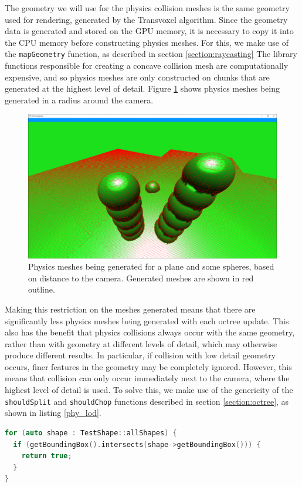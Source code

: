 \documentclass{article}
\begin{document}
The geometry we will use for the physics collision meshes is the same geometry used for rendering, generated by the Transvoxel algorithm. Since the geometry data is generated and stored on the GPU memory, it is necessary to copy it into the CPU memory before constructing physics meshes. For this, we make use of the \texttt{mapGeometry} function, as described in section \ref{section:raycasting}
The library functions responsible for creating a concave collision mesh are computationally expensive, and so physics meshes are only constructed on chunks that are generated at the highest level of detail. Figure \ref{fig:meshes1} shows physics meshes being generated in a radius around the camera.

\begin{figure}[H]
  \includegraphics[width=\textwidth]{meshes1.png}
  \caption{Physics meshes being generated for a plane and some spheres, based on distance to the camera. Generated meshes are shown in red outline.}
  \label{fig:meshes1}
\end{figure}

Making this restriction on the meshes generated means that there are significantly less physics meshes being generated with each octree update. This also has the benefit that physics collisions always occur with the same geometry, rather than with geometry at different levels of detail, which may otherwise produce different results. In particular, if collision with low detail geometry occurs, finer features in the geometry may be completely ignored. However, this means that collision can only occur immediately next to the camera, where the highest level of detail is used. To solve this, we make use of the genericity of the \texttt{shouldSplit} and \texttt{shouldChop} functions described in section \ref{section:octree}, as shown in listing \ref{phy_lod}.
\begin{lstlisting}[language=C++,label={phy_lod},caption={Snippet from \texttt{shouldSplit} responsible for increasing the level of detail near a set of test physics objects. All chunks with bounding boxes that intersect the bounding box of a physics shape will be split until the highest detail level is reached. The octree refinement process described in section \ref{section:octree_refinement} ensures that this does not create any places where very different levels of detail are adjacent to each other.}]
for (auto shape : TestShape::allShapes) {
  if (getBoundingBox().intersects(shape->getBoundingBox())) {
    return true;
  }
}
\end{lstlisting}
\end{document}

